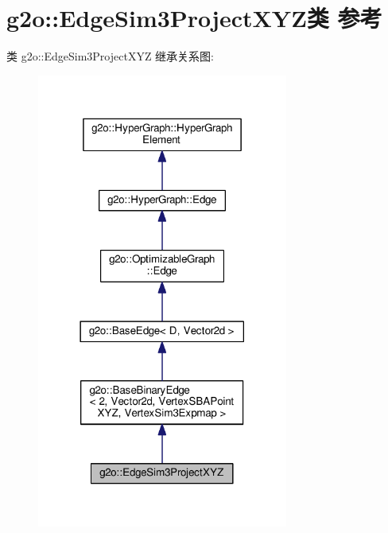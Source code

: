 \hypertarget{classg2o_1_1EdgeSim3ProjectXYZ}{\section{g2o\-:\-:Edge\-Sim3\-Project\-X\-Y\-Z类 参考}
\label{classg2o_1_1EdgeSim3ProjectXYZ}
}


类 g2o\-:\-:Edge\-Sim3\-Project\-X\-Y\-Z 继承关系图\-:
\nopagebreak
\begin{figure}[H]
\begin{center}
\leavevmode
\includegraphics[width=234pt]{classg2o_1_1EdgeSim3ProjectXYZ__inherit__graph}
\end{center}
\end{figure}


